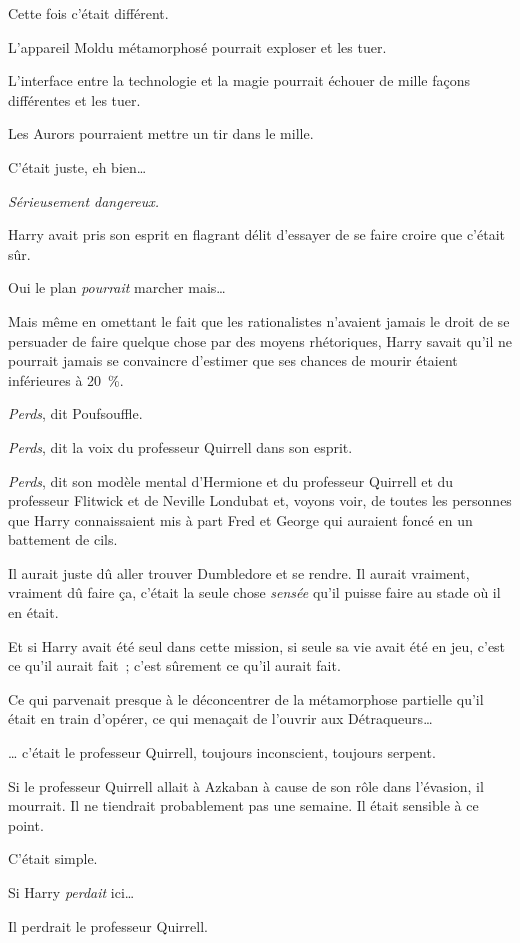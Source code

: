 Cette fois c'était différent.

L'appareil Moldu métamorphosé pourrait exploser et les tuer.

L'interface entre la technologie et la magie pourrait échouer de mille façons différentes et les tuer.

Les Aurors pourraient mettre un tir dans le mille.

C'était juste, eh bien…

\emph{Sérieusement dangereux.}

Harry avait pris son esprit en flagrant délit d'essayer de se faire croire que c'était sûr.

Oui le plan \emph{pourrait} marcher mais…

Mais même en omettant le fait que les rationalistes n'avaient jamais le droit de se persuader de faire quelque chose par des moyens rhétoriques, Harry savait qu'il ne pourrait jamais se convaincre d'estimer que ses chances de mourir étaient inférieures à 20~\%.

\emph{Perds}, dit Poufsouffle.

\emph{Perds}, dit la voix du professeur Quirrell dans son esprit.

\emph{Perds}, dit son modèle mental d'Hermione et du professeur Quirrell et du professeur Flitwick et de Neville Londubat et, voyons voir, de toutes les personnes que Harry connaissaient mis à part Fred et George qui auraient foncé en un battement de cils.

Il aurait juste dû aller trouver Dumbledore et se rendre. Il aurait vraiment, vraiment dû faire ça, c'était la seule chose \emph{sensée} qu'il puisse faire au stade où il en était.

Et si Harry avait été seul dans cette mission, si seule sa vie avait été en jeu, c'est ce qu'il aurait fait~; c'est sûrement ce qu'il aurait fait.

Ce qui parvenait presque à le déconcentrer de la métamorphose partielle qu'il était en train d'opérer, ce qui menaçait de l'ouvrir aux Détraqueurs…

… c'était le professeur Quirrell, toujours inconscient, toujours serpent.

Si le professeur Quirrell allait à Azkaban à cause de son rôle dans l'évasion, il mourrait. Il ne tiendrait probablement pas une semaine. Il était sensible à ce point.

C'était simple.

Si Harry \emph{perdait} ici…

Il perdrait le professeur Quirrell.

